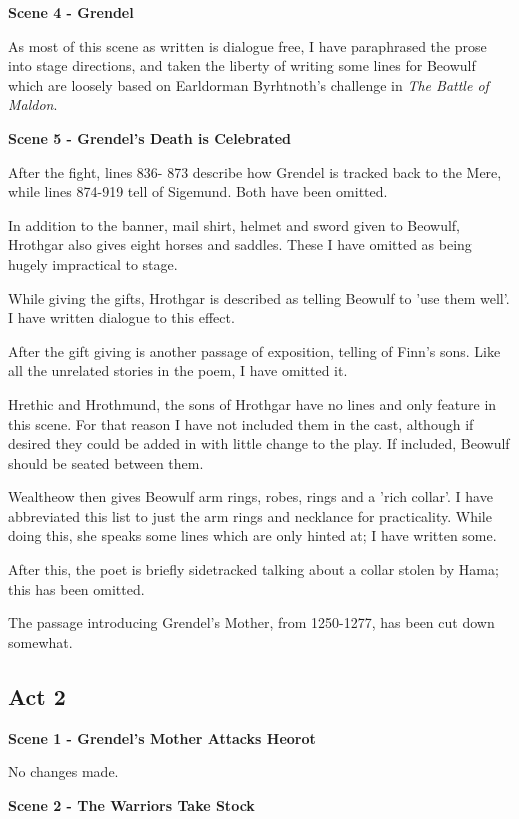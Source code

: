 \documentclass[a4paper]{article}
\begin{document}
{\centerline{\textbf{Scene 4 - Grendel}}

As most of this scene as written is dialogue free, I have paraphrased the prose into
stage directions, and taken the liberty of writing some lines for Beowulf which are
loosely based on Earldorman Byrhtnoth's challenge in \textit{The Battle of Maldon}.

\centerline{\textbf{Scene 5 - Grendel's Death is Celebrated}}

After the fight, lines 836- 873 describe how Grendel is tracked back to the Mere, while
lines 874-919 tell of Sigemund. Both have been omitted.

In addition to the banner, mail shirt, helmet and sword given to Beowulf,
Hrothgar also gives eight horses and saddles. These I have omitted as being
hugely impractical to stage.

While giving the gifts, Hrothgar is described as telling Beowulf to 'use them well'.
I have written dialogue to this effect.

After the gift giving is another passage of exposition, telling of Finn's sons.
Like all the unrelated stories in the poem, I have omitted it.

Hrethic and Hrothmund, the sons of Hrothgar have no lines and only feature in this scene.
For that reason I have not included them in the cast, although if desired they 
could be added in with little change to the play. If included, Beowulf should
be seated between them.

Wealtheow then gives Beowulf arm rings, robes, rings and a 'rich collar'. I
have abbreviated this list to just the arm rings and necklance for practicality. 
While doing this, she speaks some lines which are only hinted at; I have written some.

After this, the poet is briefly sidetracked talking about a collar stolen by Hama;
this has been omitted.

The passage introducing Grendel's Mother, from 1250-1277, has been cut down somewhat.

\subsection{Act 2}%

\centerline{\textbf{Scene 1 - Grendel's Mother Attacks Heorot}}

No changes made.

\centerline{\textbf{Scene 2 - The Warriors Take Stock}}

}
\end{document}
